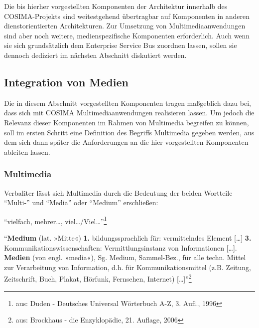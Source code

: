 
  Die bis hierher vorgestellten Komponenten der Architektur innerhalb des COSIMA-Projekts sind weitestgehend übertragbar auf Komponenten in anderen dienstorientierten Architekturen. Zur Umsetzung von Multimediaanwendungen sind aber noch weitere, medienspezifische Komponenten erforderlich. Auch wenn sie sich grundsätzlich dem Enterprise Service Bus zuordnen lassen, sollen sie dennoch dediziert im nächsten Abschnitt diskutiert werden.


\subsection{Integration von Medien} %
\label{sub:integration_von_medien}

  Die in diesem Abschnitt vorgestellten Komponenten tragen maßgeblich dazu bei, dass sich mit COSIMA Multimediaanwendungen realisieren lassen. Um jedoch die Relevanz dieser Komponenten im Rahmen von Multimedia begreifen zu können, soll im ersten Schritt eine Definition des Begriffs Multimedia gegeben werden, aus dem sich dann später die Anforderungen an die hier vorgestellten Komponenten ableiten lassen.
  
\subsubsection{Multimedia} %
\label{ssub:definition_multimedia}
  
  Verbaliter lässt sich Multimedia durch die Bedeutung der beiden Wortteile "`Multi-"' und "`Media"' oder "`Medium"' erschließen:

  \begin{definition}[Multi-]\label{def:multi_}
    "`vielfach, mehrer\ldots, viel\ldots/Viel\ldots"'\footnote{aus: Duden - Deutsches Universal Wörterbuch A-Z, 3. Aufl., 1996}
  \end{definition}
  
  \begin{definition}\label{def:medium}
    "`\textbf{Medium} (lat. »Mitte«) \textbf{1.} bildungssprachlich für: vermittelndes Element [\ldots] \textbf{3.} Kommunikationswissenschaften: Vermittlungsinstanz von Informationen [\ldots]. \textbf{Medien} (von engl. »media«), Sg. Medium, Sammel-Bez., für alle techn. Mittel zur Verarbeitung von Information, d.h. für Kommunikationsmittel (z.B. Zeitung, Zeitschrift, Buch, Plakat, Hörfunk, Fernsehen, Internet) [\ldots]"'\footnote{aus: Brockhaus - die Enzyklopädie, 21. Auflage, 2006}
  \end{definition}
  
